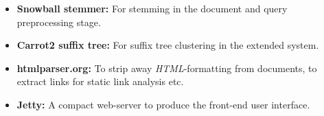 \begin{itemize}
	\item \textbf{Snowball stemmer:} For stemming in the document and query preprocessing stage.
	\item \textbf{Carrot2 suffix tree:} For suffix tree clustering in the extended system. 
	\item \textbf{htmlparser.org:} To strip away \emph{HTML}-formatting from documents, to extract links for static link analysis etc.
	\item \textbf{Jetty:} A compact web-server to produce the front-end user interface. 	 
\end{itemize}
